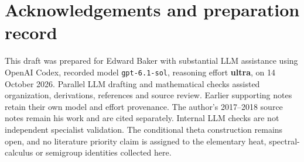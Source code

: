 \documentclass[11pt]{article}
\numberwithin{equation}{section}
\theoremstyle{definition}
\theoremstyle{remark}
\begin{document}
\section*{Acknowledgements and preparation record}
This draft was prepared for Edward Baker with substantial LLM assistance
using OpenAI Codex, recorded model \texttt{gpt-6.1-sol}, reasoning effort
\textbf{ultra}, on 14 October 2026. Parallel LLM drafting and mathematical
checks assisted organization, derivations, references and source review.
Earlier supporting notes retain their own model and effort provenance.
The author's 2017--2018 source notes remain his work and are cited
separately. Internal LLM checks are not independent specialist validation.
The conditional theta construction remains open, and no literature
priority claim is assigned to the elementary heat, spectral-calculus or
semigroup identities collected here.
\end{document}
